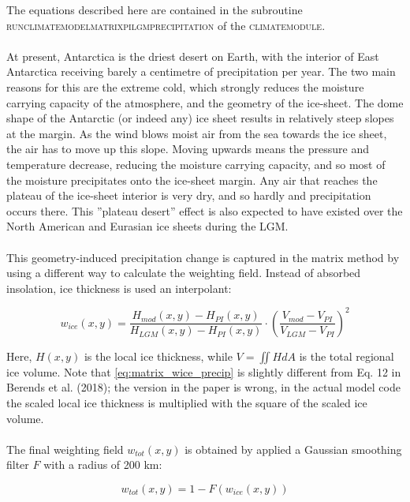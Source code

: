 \documentclass{article}
\begin{document}
The equations described here are contained in the subroutine \textsc{run\textunderscore climate\textunderscore model\textunderscore matrix\textunderscore pi\textunderscore lgm\textunderscore precipitation} of the \textsc{climate\textunderscore module}.\\
\\
At present, Antarctica is the driest desert on Earth, with the interior of East Antarctica receiving barely a centimetre of precipitation per year. The two main reasons for this are the extreme cold, which strongly reduces the moisture carrying capacity of the atmosphere, and the geometry of the ice-sheet. The dome shape of the Antarctic (or indeed any) ice sheet results in relatively steep slopes at the margin. As the wind blows moist air from the sea towards the ice sheet, the air has to move up this slope. Moving upwards means the pressure and temperature decrease, reducing the moisture carrying capacity, and so most of the moisture precipitates onto the ice-sheet margin. Any air that reaches the plateau of the ice-sheet interior is very dry, and so hardly and precipitation occurs there. This ''plateau desert'' effect is also expected to have existed over the North American and Eurasian ice sheets during the LGM.\\
\\
This geometry-induced precipitation change is captured in the matrix method by using a different way to calculate the weighting field. Instead of absorbed insolation, ice thickness is used an interpolant:

\begin{equation} \label{eq:matrix_wice_precip}
w_{ice} (x,y) = \frac{H_{mod}(x,y) - H_{PI}(x,y)}{H_{LGM}(x,y) - H_{PI}(x,y)} \cdot
\left( \frac{V_{mod} - V_{PI}}{V_{LGM} - V_{PI}} \right)^2
\end{equation}

Here, $H(x,y)$ is the local ice thickness, while $V = \iint H dA$ is the total regional ice volume. Note that \eqref{eq:matrix_wice_precip} is slightly different from Eq. 12 in Berends et al. (2018); the version in the paper is wrong, in the actual model code the scaled local ice thickness is multiplied with the square of the scaled ice volume.\\
\\
The final weighting field $w_{tot}(x,y)$ is obtained by applied a Gaussian smoothing filter $F$ with a radius of 200 km:

\begin{equation}
w_{tot} (x,y) = 1 - F( w_{ice} (x,y) )
\end{equation}
\end{document}

